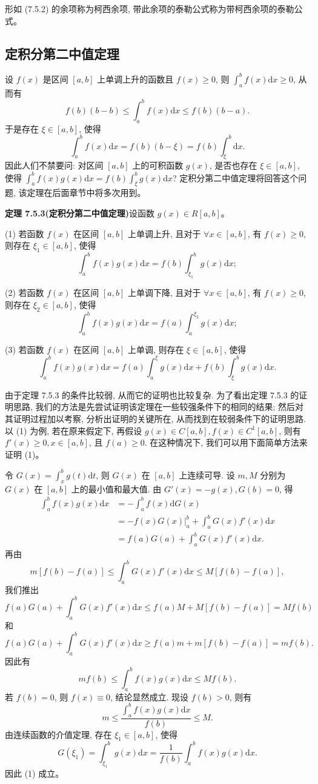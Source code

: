 \documentclass[UTF8, 12pt, fontset=fandol, oneside]{ctexart}
\begin{document}
形如 (7.5.2) 的余项称为柯西余项, 带此余项的泰勒公式称为带柯西余项的泰勒公式。

\subsection{定积分第二中值定理}

设 $f(x)$ 是区间 $[a,b]$ 上单调上升的函数且 $f(x)\geq0$, 则 $\int_a^b f(x)\mathrm dx\geq0$, 从而有
\[
  f(b)(b-b)\leq\int_a^b f(x)\mathrm dx\leq f(b)(b-a).
\]
于是存在 $\xi\in[a,b]$, 使得
\[
  \int_a^b f(x)\mathrm dx=f(b)(b-\xi)=f(b)\int_\xi^b\mathrm dx.
\]
因此人们不禁要问: 对区间 $[a,b]$ 上的可积函数 $g(x)$, 是否也存在 $\xi\in[a,b]$, 使得 $\int_a^b f(x)g(x)\mathrm dx=f(b)\int_\xi^b g(x)\mathrm dx$? 定积分第二中值定理将回答这个问题, 该定理在后面章节中将多次用到。

\noindent\textbf{定理 7.5.3(定积分第二中值定理)}\quad 设函数 $g(x)\in R[a,b]$。

(1) 若函数 $f(x)$ 在区间 $[a,b]$ 上单调上升, 且对于 $\forall x\in[a,b]$, 有 $f(x)\geq0$, 则存在 $\xi_1\in[a,b]$, 使得
\[
  \int_a^b f(x)g(x)\mathrm dx=f(b)\int_{\xi_1}^b g(x)\mathrm dx;
\]

(2) 若函数 $f(x)$ 在区间 $[a,b]$ 上单调下降, 且对于 $\forall x\in[a,b]$, 有 $f(x)\geq0$, 则存在 $\xi_2\in[a,b]$, 使得
\[
  \int_a^b f(x)g(x)\mathrm dx=f(a)\int_a^{\xi_2} g(x)\mathrm dx;
\]

(3) 若函数 $f(x)$ 在区间 $[a,b]$ 上单调, 则存在 $\xi\in[a,b]$, 使得
\[
  \int_a^b f(x)g(x)\mathrm dx
  =f(a)\int_a^\xi g(x)\mathrm dx+f(b)\int_\xi^b g(x)\mathrm dx.
\]

由于定理 7.5.3 的条件比较弱, 从而它的证明也比较复杂. 为了看出定理 7.5.3 的证明思路, 我们的方法是先尝试证明该定理在一些较强条件下的相同的结果; 然后对其证明过程加以考察, 分析出证明的关键所在, 从而找到在较弱条件下的证明思路. 以 (1) 为例, 若在原来假定下, 再假设 $g(x)\in C[a,b],f(x)\in C^1[a,b]$, 则有 $f'(x)\geq0,x\in[a,b]$, 且 $f(a)\geq0$. 在这种情况下, 我们可以用下面简单方法来证明 (1)。

令 $G(x)=\int_x^b g(t)\mathrm dt$, 则 $G(x)$ 在 $[a,b]$ 上连续可导. 设 $m,M$ 分别为 $G(x)$ 在 $[a,b]$ 上的最小值和最大值. 由 $G'(x)=-g(x),G(b)=0$, 得
\[
\begin{aligned}
  \int_a^b f(x)g(x)\mathrm dx
  &=-\int_a^b f(x)\mathrm dG(x)\\
  &=-\left.f(x)G(x)\right|_a^b+\int_a^b G(x)f'(x)\mathrm dx\\
  &=f(a)G(a)+\int_a^b G(x)f'(x)\mathrm dx.
\end{aligned}
\]
再由
\[
  m[f(b)-f(a)]\leq\int_a^b G(x)f'(x)\mathrm dx\leq M[f(b)-f(a)],
\]
我们推出
\[
  f(a)G(a)+\int_a^b G(x)f'(x)\mathrm dx
  \leq f(a)M+M[f(b)-f(a)]=Mf(b)
\]
和
\[
  f(a)G(a)+\int_a^b G(x)f'(x)\mathrm dx
  \geq f(a)m+m[f(b)-f(a)]=mf(b).
\]
因此有
\[
  mf(b)\leq\int_a^b f(x)g(x)\mathrm dx\leq Mf(b).
\]
若 $f(b)=0$, 则 $f(x)\equiv0$, 结论显然成立. 现设 $f(b)>0$, 则有
\[
  m\leq\frac{\int_a^b f(x)g(x)\mathrm dx}{f(b)}\leq M.
\]
由连续函数的介值定理, 存在 $\xi_1\in[a,b]$, 使得
\[
  G(\xi_1)=\int_{\xi_1}^b g(x)\mathrm dx
  =\frac{1}{f(b)}\int_a^b f(x)g(x)\mathrm dx.
\]
因此 (1) 成立。
\end{document}
